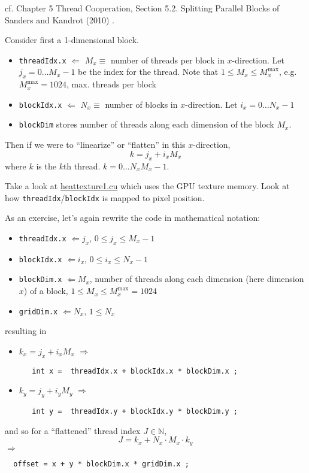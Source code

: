 \documentclass[10pt]{amsart}
\begin{document}
\begin{multicols*}{2}
cf. Chapter 5 Thread Cooperation, Section 5.2. Splitting Parallel Blocks of Sanders and Kandrot (2010) \cite{SK2010}.

Consider first a 1-dimensional block.

\begin{itemize}
\item \verb|threadIdx.x| $\Longleftarrow$ $M_x \equiv $ number of threads per block in $x$-direction.  Let $j_x = 0 \dots M_x-1$ be the index for the thread.  Note that $1 \leq M_x \leq M_x^{\text{max}}$, e.g. $M_x^{\text{max}} = 1024$, max. threads per block 
\item \verb|blockIdx.x| $\Longleftarrow$ $N_x \equiv $ number of blocks in $x$-direction.  Let $i_x = 0\dots N_x-1$
\item \verb|blockDim| stores number of threads along each dimension of the block $M_x$.  
  \end{itemize}

Then if we were to ``linearize'' or ``flatten'' in this $x$-direction,
\[
 k = j_x + i_x M_x
 \]
 where $k$ is the $k$th thread.  $k=0\dots N_xM_x -1$.

 Take a look at \href{https://github.com/ernestyalumni/CompPhys/blob/master/CUDA-By-Example/heattexture1.cu}{heattexture1.cu} which uses the GPU texture memory.  Look at how \verb|threadIdx|/\verb|blockIdx| is mapped to pixel position.

 As an exercise, let's again rewrite the code in mathematical notation:
 \begin{itemize}\label{List:threadblockdict}
\item \verb|threadIdx.x| $\Longleftarrow j_x$, $0\leq j_x \leq M_x -1$ 
\item \verb|blockIdx.x| $\Longleftarrow i_x$, $0\leq i_x \leq N_x -1$
\item \verb|blockDim.x| $\Longleftarrow M_x$, number of threads along each dimension (here dimension $x$) of a block, $1 \leq M_x \leq M_x^{\text{max}} = 1024$
\item \verb|gridDim.x| $\Longleftarrow N_x$, $1\leq N_x$
   \end{itemize}
 resulting in
 \begin{itemize}
 \item $k_x = j_x +i_x M_x$ $\Longrightarrow$
   \begin{lstlisting}
   int x =  threadIdx.x + blockIdx.x * blockDim.x ;
     \end{lstlisting}
\item $k_y = j_y +i_y M_y$ $\Longrightarrow$
   \begin{lstlisting}
   int y =  threadIdx.y + blockIdx.y * blockDim.y ;
     \end{lstlisting}
 \end{itemize}
 and so for a ``flattened'' thread index $J \in \mathbb{N}$,
 \[
J = k_x + N_x\cdot M_x \cdot k_y
\]
$\Longrightarrow $
\begin{lstlisting}
  offset = x + y * blockDim.x * gridDim.x ;
  \end{lstlisting}
 

\end{multicols*}
\end{document}
